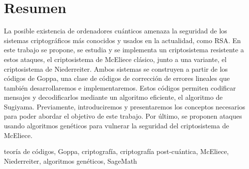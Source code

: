 \chapter*{Resumen}

La posible existencia de ordenadores cuánticos amenaza la seguridad de los sistemas criptográficos más conocidos y usados en la actualidad, como RSA. En este trabajo se propone, se estudia y se implementa un criptosistema resistente a estos ataques, el criptosistema de McEliece clásico, junto a una variante, el criptosistema de Niederreiter. Ambos sistemas se construyen a partir de los códigos de Goppa, una clase de códigos de corrección de errores lineales que también desarrollaremos e implementaremos. Estos códigos permiten codificar mensajes y decodificarlos mediante un algoritmo eficiente, el algoritmo de Sugiyama. Previamente, introduciremos y presentaremos los conceptos necesarios para poder abordar el objetivo de este trabajo. Por último, se proponen ataques usando algoritmos genéticos para vulnerar la seguridad del criptosistema de McEliece.

\small{ teoría de códigos, \; Goppa, \; criptografía, \; criptografía post-cuántica, \; McEliece, \; Niederreiter, \; algoritmos genéticos, \; SageMath}

\newpage
